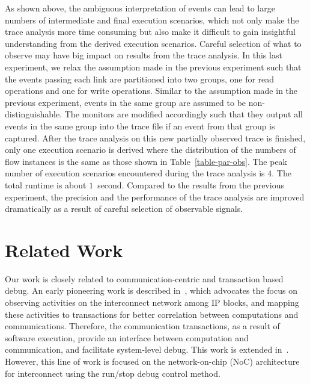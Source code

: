 \documentclass[conference]{IEEEtran}
\begin{document}
As shown above, the ambiguous interpretation of events can lead to large numbers of intermediate and final execution scenarios, which not only make the trace analysis more time consuming but also make it difficult to gain insightful understanding from the derived execution scenarios.  Careful selection of what to observe may have big impact on results from the trace analysis.  In this last experiment, we relax the assumption made in the previous experiment such that the events passing each link are partitioned into two groups, one for read operations and one for write operations.  Similar to the assumption made in the previous experiment, events in the same group are assumed to be non-distinguishable.  The monitors are modified accordingly such that they output all events in the same group into the trace file if an event from that group is captured.  After the trace analysis on this new partially observed trace is finished, only one execution scenario is derived where the distribution of the numbers of flow instances is the same as those shown in Table~\ref{table-par-obs}.  The peak number of execution scenarios encountered during the trace analysis is $4$.  The total runtime is about $1$~second.  Compared to the results from the previous experiment, the precision and the performance of the trace analysis are improved dramatically as a result of careful selection of observable signals. 

\section{Related Work}

Our work is closely related to communication-centric and transaction based debug.  An early pioneering work is described in~\cite{Goossens2007NOCS}, which advocates the focus on observing activities on the interconnect network among IP blocks, and mapping these activities to transactions for better correlation between computations and communications.  Therefore, the communication transactions, as a result of software execution, provide an interface between computation and communication, and facilitate  system-level debug.  This work is extended in~\cite{Vermeulen2009VLSI-DAT,Goossens2009DATE}.  However, this line of work is focused on the network-on-chip (NoC) architecture for interconnect using the run/stop debug control method.  
\end{document}

